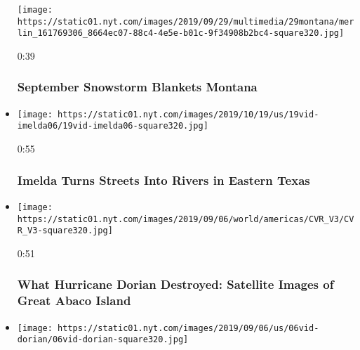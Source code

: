 \begin{itemize}
  \texttt{[image: https://static01.nyt.com/images/2019/09/29/multimedia/29montana/merlin\_161769306\_8664ec07-88c4-4e5e-b01c-9f34908b2bc4-square320.jpg]}

  0:39

  \hypertarget{september-snowstorm-blankets-montana}{%
  \subsubsection{September Snowstorm Blankets
  Montana}\label{september-snowstorm-blankets-montana}}
\item
  \href{https://www.nytimes.com/video/us/100000006726109/imelda-texas-floods.html?action=click\&module=video-series-bar\&region=header\&pgtype=Article\&playlistId=video/extreme-weather}{}

  \texttt{[image: https://static01.nyt.com/images/2019/10/19/us/19vid-imelda06/19vid-imelda06-square320.jpg]}

  0:55

  \hypertarget{imelda-turns-streets-into-rivers-in-eastern-texas}{%
  \subsubsection{Imelda Turns Streets Into Rivers in Eastern
  Texas}\label{imelda-turns-streets-into-rivers-in-eastern-texas}}
\item
  \href{https://www.nytimes.com/video/world/americas/100000006701860/hurricane-dorian-destruction.html?action=click\&module=video-series-bar\&region=header\&pgtype=Article\&playlistId=video/extreme-weather}{}

  \texttt{[image: https://static01.nyt.com/images/2019/09/06/world/americas/CVR\_V3/CVR\_V3-square320.jpg]}

  0:51

  \hypertarget{what-hurricane-dorian-destroyed-satellite-images-of-great-abaco-island}{%
  \subsubsection{What Hurricane Dorian Destroyed: Satellite Images of
  Great Abaco
  Island}\label{what-hurricane-dorian-destroyed-satellite-images-of-great-abaco-island}}
\item
  \href{https://www.nytimes.com/video/us/100000006699386/hurricane-dorian-carolinas.html?action=click\&module=video-series-bar\&region=header\&pgtype=Article\&playlistId=video/extreme-weather}{}

  \texttt{[image: https://static01.nyt.com/images/2019/09/06/us/06vid-dorian/06vid-dorian-square320.jpg]}


\end{itemize}
